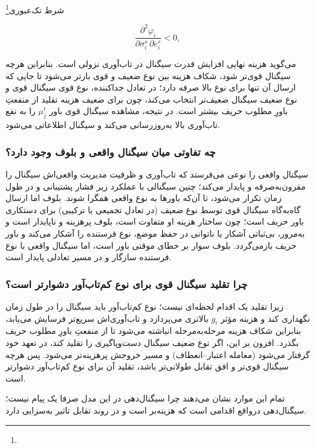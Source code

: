 \documentclass[12pt]{article}
\begin{document}
شرط تک‌عبوری\footnote{}

\begin{equation*}
    \frac{\partial^2 \varphi_i}{\partial \sigma_i^s \, \partial e_i^s} < 0,
\end{equation*}

می‌گوید هزینه نهایی افزایش قدرت سیگنال در تاب‌آوری نزولی است. بنابراین هرچه
 سیگنال قوی‌تر شود، شکاف هزینه بین نوع ضعیف و قوی بازتر می‌شود تا جایی که
 ارسال آن تنها برای نوع بالا صرفه دارد؛ در تعادل جداکننده، نوع قوی سیگنال
 قوی و نوع ضعیف سیگنال ضعیف‌تر انتخاب می‌کند، چون برای ضعیف هزینه تقلید
 از منفعتِ باورِ مطلوب حریف بیشتر است. در نتیجه، مشاهده سیگنال قوی باور 
 $\mu_j^t$
  را به نفع تاب‌آوری بالا به‌روزرسانی می‌کند و سیگنال اطلاعاتی می‌شود.

\subsubsection*{چه تفاوتی میان سیگنال واقعی و بلوف وجود دارد؟}

سیگنال واقعی را نوعی می‌فرستد که تاب‌آوری و ظرفیت مدیریت واقعی‌اش سیگنال را مقرون‌به‌صرفه 
و پایدار می‌کند؛ چنین سیگنالی با عملکرد زیر فشار پشتیبانی و در طول زمان تکرار می‌شود، تا
آن‌که باورها به نوع واقعی همگرا شوند.
بلوف اما ارسال گاه‌به‌گاه سیگنال قوی توسط نوع ضعیف 
(در تعادل تجمیعی یا ترکیبی)
برای دستکاری باور حریف است؛ چون ساختار هزینه او متفاوت است، بلوف پرهزینه و ناپایدار
است و به‌مرور، بی‌ثباتی آشکار یا ناتوانی در حفظ موضع، نوع فرستنده را
آشکار می‌کند و باور حریف بازمی‌گردد. بلوف سوار بر خطای موقتی باور است،
اما سیگنال واقعی با نوع فرستنده سازگار و در مسیر تعادلی پایدار است.

\subsubsection*{چرا تقلید سیگنال قوی برای نوع کم‌تاب‌آور دشوارتر است؟}

زیرا تقلید یک اقدام لحظه‌ای نیست؛ 
نوع کم‌تاب‌آور باید سیگنال را در طول زمان نگهداری کند و هزینه مؤثر $g_i$
 بالاتری می‌پردازد و تاب‌آوری‌اش سریع‌تر فرسایش می‌یابد، بنابراین شکاف هزینه مرحله‌به‌مرحله
  انباشته می‌شود تا از منفعتِ باورِ مطلوب حریف بگذرد. افزون بر این،
  اگر نوع ضعیف سیگنال دست‌وپاگیری را تقلید کند، در تعهد خود گرفتار می‌شود 
  (معامله اعتبار–انعطاف) و مسیر خروجش پرهزینه‌تر می‌شود.
   پس هرچه سیگنال قوی‌تر و افق تقابل طولانی‌تر باشد،
   تقلید آن برای نوع کم‌تاب‌آور دشوارتر است.

   \vspace{0.7cm}
   تمام این موارد نشان می‌دهند چرا سیگنال‌دهی در این مدل صرفا یک پیام نیست؛
   سیگنال‌دهی درواقع اقدامی است که هزینه‌بر است و در روند تقابل تاثیر به‌سزایی دارد.
\end{document}
